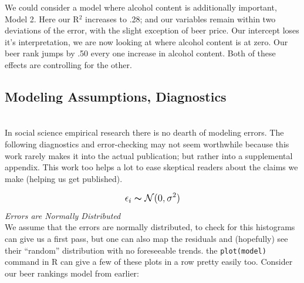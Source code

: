 \documentclass[12pt]{article}\usepackage[]{graphicx}\usepackage[]{color}
\begin{document}
\begin{flushleft}
We could consider a model where alcohol content is additionally important, Model 2. Here our R$^2$ increases to .28; and our variables remain within two deviations of the error, with the slight exception of beer price. Our intercept loses it's interpretation, we are now looking at where alcohol content is at zero. Our beer rank jumps by .50 every one increase in alcohol content. Both of these effects are controlling for the other.













\clearpage
\subsection{Modeling Assumptions, Diagnostics}
\hfill \\
In social science empirical research there is no dearth of modeling errors. The following diagnostics and error-checking may not seem worthwhile because this work rarely makes it into the actual publication; but rather into a supplemental appendix. This work too helps a lot to ease skeptical readers about the claims we make (helping us get published).

\begin{equation}
\mathlarger{  \epsilon_i  \thicksim \mathcal{N}(0, \sigma^2)             }
\end{equation}
\noindent \textit{Errors are Normally Distributed}\\
We assume that the errors are normally distributed, to check for this histograms can give us a first pass, but one can also map the residuals and (hopefully) see their ``random'' distribution with no foreseeable trends. the \texttt{plot(model)} command in R can give a few of these plots in a row pretty easily too. Consider our beer rankings model from earlier: \\
\hfill \\


\end{flushleft}
\end{document}
